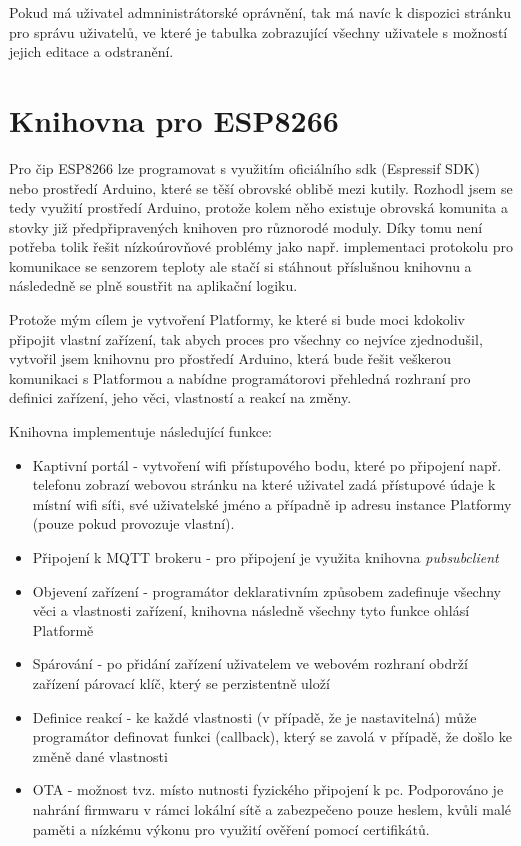 Pokud má uživatel admninistrátorské oprávnění, tak má navíc k dispozici stránku pro správu uživatelů, ve které je tabulka zobrazující všechny uživatele s možností jejich editace a odstranění.

\section{Knihovna pro ESP8266}
Pro čip ESP8266 lze programovat s využitím oficiálního sdk (Espressif SDK) nebo prostředí Arduino, které se těší obrovské oblibě mezi kutily. Rozhodl jsem se tedy využití prostředí Arduino, protože kolem něho existuje obrovská komunita a stovky již předpřipravených knihoven pro různorodé moduly. Díky tomu není potřeba tolik řešit nízkoúrovňové problémy jako např. implementaci protokolu pro komunikace se senzorem teploty ale stačí si stáhnout příslušnou knihovnu a následedně se plně soustřit na aplikační logiku.

Protože mým cílem je vytvoření Platformy, ke které si bude moci kdokoliv připojit vlastní zařízení, tak abych proces pro všechny co nejvíce zjednodušil, vytvořil jsem knihovnu pro přostředí Arduino, která bude řešit veškerou komunikaci s Platformou a nabídne programátorovi přehledná rozhraní pro definici zařízení, jeho věci, vlastností a reakcí na změny.

Knihovna implementuje následující funkce:
\begin{itemize}
    \item Kaptivní portál - vytvoření wifi přístupového bodu, které po připojení např. telefonu zobrazí webovou stránku na které uživatel zadá přístupové údaje k místní wifi síťi, své uživatelské jméno a případně ip adresu instance Platformy (pouze pokud provozuje vlastní).
    \item Připojení k MQTT brokeru - pro připojení je využita knihovna \textit{pubsubclient}
    \item Objevení zařízení - programátor deklarativním způsobem zadefinuje všechny věci a vlastnosti zařízení, knihovna následně všechny tyto funkce ohlásí Platformě
    \item Spárování - po přidání zařízení uživatelem ve webovém rozhraní obdrží zařízení párovací klíč, který se perzistentně uloží
    \item Definice reakcí - ke každé vlastnosti (v případě, že je nastavitelná) může programátor definovat funkci (callback), který se zavolá v případě, že došlo ke změně dané vlastnosti
    \item OTA - možnost tvz.  místo nutnosti fyzického připojení k pc. Podporováno je nahrání firmwaru v rámci lokální sítě a zabezpečeno pouze heslem, kvůli malé paměti a nízkému výkonu pro využití ověření pomocí certifikátů.
\end{itemize}

